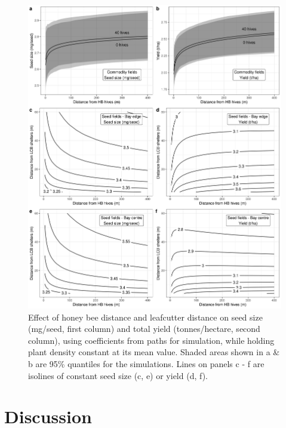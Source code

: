 \documentclass[12pt]{article} %
\begin{document}
\begin{figure}
    \centering
    \includegraphics[width=\textwidth,keepaspectratio=true]{../Figures/allYield.png}
    \caption{Effect of honey bee distance and leafcutter distance on seed size (mg/seed, first column) and total yield (tonnes/hectare, second column), using coefficients from paths for simulation, while holding plant density constant at its mean value. Shaded areas shown in a \& b are 95\% quantiles for the simulations. Lines on panels c - f are isolines of constant seed size (c, e) or yield (d, f).}
    \label{fig:allYield}
\end{figure}

\section*{Discussion}
\end{document}
